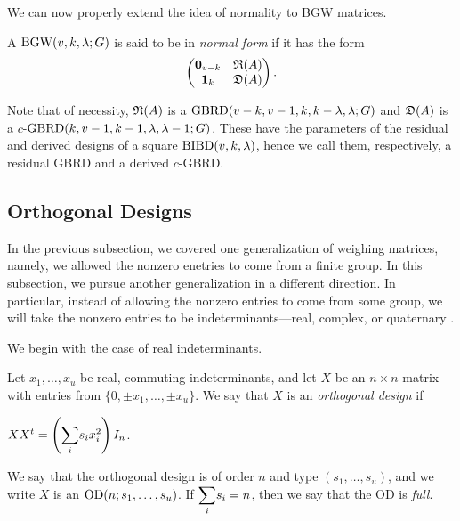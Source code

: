 \documentclass[../../../main]{subfiles}
\begin{document}
 We can now properly extend the idea of normality to BGW matrices.
 
 \begin{defin}
  A $\text{BGW}(v,k,\lambda;G)$ is said to be in {\it normal form} if it has the form
  \begin{equation}
   \begin{pmatrix}
    \mathbf{0}_{v-k} & \mathfrak{R}(A) \\ \mathbf{1}_{k} & \mathfrak{D}(A)
   \end{pmatrix}.
  \end{equation}
 \end{defin}
 
 Note that of necessity, $\mathfrak{R}(A)$ is a $\text{GBRD}(v-k,v-1,k,k-\lambda,\lambda;G)$ and $\mathfrak{D}(A)$ is a $c$-$\text{GBRD}(k,v-1,k-1,\lambda,\lambda-1;G)$. These have the parameters of the residual and derived designs of a square $\text{BIBD}(v,k,\lambda)$, hence we call them, respectively, a residual GBRD and a derived $c$-GBRD.

 \dinkus


 \subsection{Orthogonal Designs}

 In the previous subsection, we covered one generalization of weighing matrices,
 namely, we allowed the nonzero enetries to come from a finite group. In this
 subsection, we pursue another generalization in a different direction. In
 particular, instead of allowing the nonzero entries to come from some group, we
will take the nonzero entries to be indeterminants---real, complex, or
quaternary .

We begin with the case of real indeterminants.

\begin{defin}\label{real-od-def}
  Let $x_1, \dots, x_u$ be real, commuting indeterminants, and let $X$ be an $n \times n$ matrix with entries from $\{0,\pm x_1, \dots, \pm x_u\}$. We say that $X$ is an {\it orthogonal design} if
  \begin{defenum}
  \item $XX^t = \left( \ssum_i s_ix_i^2 \right)I_n$.
  \end{defenum}
  We say that the orthogonal design is of order $n$ and type $(s_1, \dots, s_u)$, and we write $X$ is an $\text{OD}(n;s_1, \dots, s_u)$. If $\ssum_i s_i=n$, then we say that the OD is {\it full}.
\end{defin}
\end{document}

